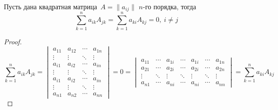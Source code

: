 \begin{consequent}
Пусть дана квадратная матрица~$A = \|a_{ij}\|$ $n$-го порядка, тогда
\begin{equation*}
\sum_{k=1}^n a_{ik} A_{jk} = \sum_{k=1}^n a_{ki} A_{kj} = 0, \ i \neq j
\end{equation*}
\end{consequent}
\begin{proof}
\begin{equation*}
\sum_{k=1}^n a_{ik} A_{jk} =
\begin{vmatrix}
a_{11} & a_{12} & \cdots & a_{1n} \\
\vdots & \vdots & \ddots & \vdots \\
a_{i1} & a_{i2} & \cdots & a_{in} \\
\vdots & \vdots & \ddots & \vdots \\
a_{i1} & a_{i2} & \cdots & a_{in} \\
\vdots & \vdots & \ddots & \vdots \\
a_{n1} & a_{n2} & \cdots & a_{nn}
\end{vmatrix} = 0 =
\begin{vmatrix}
a_{11} & \cdots & a_{1i} & \cdots & a_{1i} & \cdots & a_{1n} \\
a_{21} & \cdots & a_{2i} & \cdots & a_{2i} & \cdots & a_{2n} \\
\vdots & \ddots & \vdots & \ddots & \vdots & \ddots & \vdots \\
a_{n1} & \cdots & a_{ni} & \cdots & a_{ni} & \cdots & a_{nn}
\end{vmatrix} =
\sum_{k=1}^n a_{ki} A_{kj}
\end{equation*}
\end{proof}

